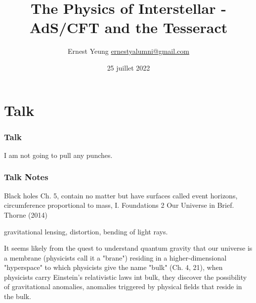 \documentclass[10pt]{amsart}
\title{The Physics of Interstellar - AdS/CFT and the Tesseract}
\author{Ernest Yeung \href{mailto:ernestyalumni@gmail.com}{ernestyalumni@gmail.com}}
\date{25 juillet 2022}
\begin{document}
	
	
	\maketitle
	
	\begin{multicols*}{2}
		
		\setcounter{tocdepth}{1}
		\tableofcontents
		
		\begin{abstract}
						
		\end{abstract}
		
		\part{}


\end{multicols*}

\part{Talk}

\section{Talk}

I am not going to pull any punches.



\section{Talk Notes}

Black holes Ch. 5, contain no matter but have surfaces called event horizons, circumference proportional to mass, I. Foundations 2 Our Universe in Brief. Thorne (2014) \cite{Thor2014}

gravitational lensing, distortion, bending of light rays.

It seems likely from the quest to understand quantum gravity that our universe is a membrane (physicists call it a "brane") residing in a higher-dimensional "hyperspace" to which physicists give the name "bulk" (Ch. 4, 21), when physicists carry Einstein's relativistic laws int bulk, they discover the possibility of gravitational anomalies, anomalies triggered by physical fields that reside in the bulk.
\end{document}
